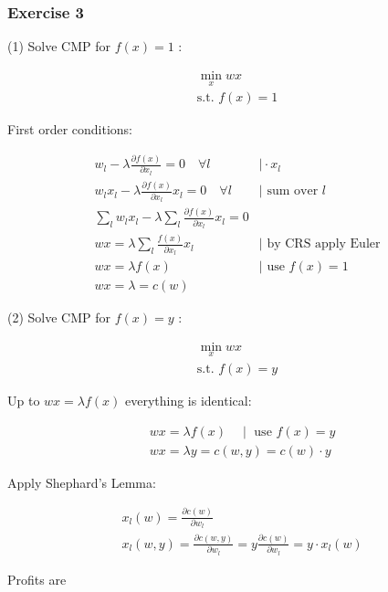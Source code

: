 {\subsubsection*{Exercise 3}
\begin{enumerate}[label=(\alph*)]
{\item 
(1) Solve CMP for $f(x)=1$ :

\begin{align*}
    \min _{x} w x \\
    \text{s.t. } f(x)=1
\end{align*}

First order conditions:

\begin{align*}
    w_{l}-\lambda \frac{\partial f(x)}{\partial x_{l}}=0 \quad \forall l & \mid \cdot x_{l} \\
    w_l x_l -\lambda \frac{\partial f(x)}{\partial x_{l}} x_{l}=0 \quad \forall l & \mid \text{ sum over } l \\
    \sum_{l} w_{l} x_{l}-\lambda \sum_{l} \frac{\partial f(x)}{\partial x_{l}} x_{l}=0 & \\
    w x=\lambda \sum_{l} \frac{f(x)}{\partial x_{l}} x_{l} & \mid \text{ by CRS apply Euler} \\
    w x=\lambda f(x) & \mid \text{ use } f(x) = 1 \\
    w x=\lambda=c(w) & 
\end{align*}

(2) Solve CMP for $f(x)=y$ :

\begin{align*}
    \min _{x} w x \\
    \text{s.t. } f(x)=y
\end{align*}

Up to $w x=\lambda f(x)$ everything is identical:

$$
\begin{aligned}
& w x=\lambda f(x) \quad \mid \text { use } f(x)=y \\
& w x=\lambda y=c(w, y)=c(w) \cdot y
\end{aligned}
$$
}
{\item 
Apply Shephard's Lemma:

$$
\begin{aligned}
& x_{l}(w)=\frac{\partial c(w)}{\partial w_{l}} \\
& x_{l}(w, y)=\frac{\partial c(w, y)}{\partial w_{l}}=y \frac{\partial c(w)}{\partial w_{l}}=y \cdot x_{l}(w)
\end{aligned}
$$
}
{\item 
Profits are

}
\end{enumerate}}
